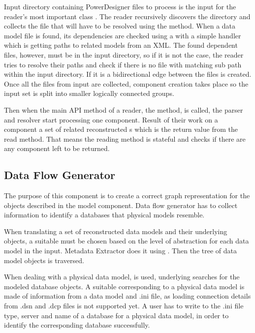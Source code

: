 Input directory containing PowerDesigner files to process is the input for the reader's most important class . 
The reader recursively discovers the directory and collects the file that will have to be resolved using the  method. 
When a data model file is found, its dependencies are checked using a  with a simple handler  which is getting paths to related models from an XML.
The found dependent files, however, must be in the input directory, so if it is not the case, the reader tries to resolve their paths and check if there is no file with matching sub path within the input directory. If it is a bidirectional edge between the files is created. 
Once all the files from input are collected, component creation takes place so the input set is split into smaller logically connected groups.

Then when the main API method of a reader, the  method, is called, the parser and resolver start processing one component. Result of their work on a component a set of related reconstructed s which is the return value from the read method. 
That means the reading method is stateful and  checks if there are any component left to be returned.

\subsection{Data Flow Generator}

The purpose of this component is to create a correct graph representation for the objects described in the model component. Data flow generator has to collect information to identify a databases that physical models resemble.

When translating a set of reconstructed data models and their underlying objects, a suitable  must be chosen based on the level of abstraction for each data model  in the input. Metadata Extractor does it using .
Then the tree of data model objects is traversed.
 
When dealing with a physical data model,  is used, underlying  searches for the modeled database objects. 
A suitable  corresponding to a physical data model is made of information from a data model and .ini file, as loading connection details from .dsn and .dcp files is not supported yet. A user has to write to the .ini file type, server and name of a database for a physical data model, in order to identify the corresponding database successfully.

